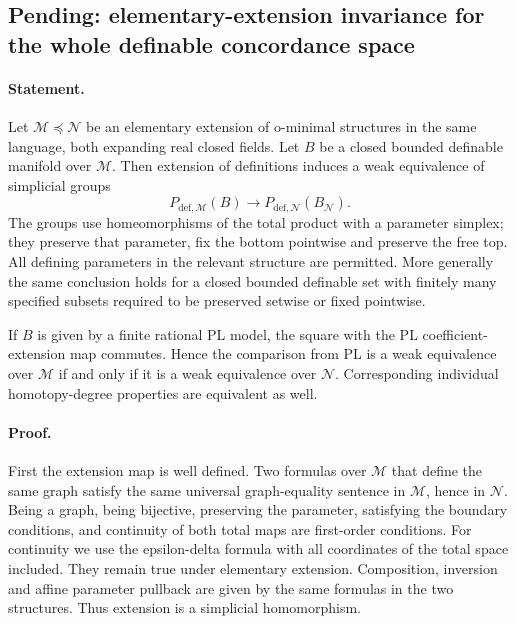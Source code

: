 \subsection*{Pending: elementary-extension invariance for the whole definable concordance space}

\paragraph{Statement.}
Let $\mathcal M\preccurlyeq\mathcal N$ be an elementary extension of
o-minimal structures in the same language, both expanding real closed
fields. Let $B$ be a closed bounded definable manifold over $\mathcal M$.
Then extension of definitions induces a weak equivalence of simplicial
groups
\[
 P_{\mathrm{def},\mathcal M}(B)
 \longrightarrow
 P_{\mathrm{def},\mathcal N}(B_{\mathcal N}).
\]
The groups use homeomorphisms of the total product with a parameter
simplex; they preserve that parameter, fix the bottom pointwise and
preserve the free top. All defining parameters in the relevant structure
are permitted. More generally the same conclusion holds for a closed
bounded definable set with finitely many specified subsets required to
be preserved setwise or fixed pointwise.

If $B$ is given by a finite rational PL model, the square with the PL
coefficient-extension map commutes. Hence the comparison from PL is a
weak equivalence over $\mathcal M$ if and only if it is a weak equivalence
over $\mathcal N$. Corresponding individual homotopy-degree properties
are equivalent as well.

\paragraph{Proof.}
First the extension map is well defined. Two formulas over $\mathcal M$
that define the same graph satisfy the same universal graph-equality
sentence in $\mathcal M$, hence in $\mathcal N$. Being a graph, being
bijective, preserving the parameter, satisfying the boundary conditions,
and continuity of both total maps are first-order conditions. For
continuity we use the epsilon-delta formula with all coordinates of the
total space included. They remain true under elementary extension.
Composition, inversion and affine parameter pullback are given by the
same formulas in the two structures. Thus extension is a simplicial
homomorphism.

